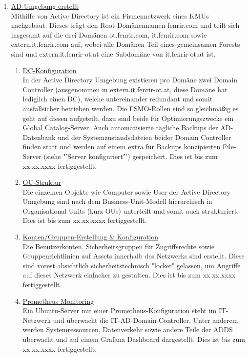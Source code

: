 \documentclass[
	headings=optiontotocandhead,%
	oneside,
	numbers=noenddot,%
	toc=flat, %
	10pt, %
	parskip=full, %
	listof=totoc, %
	listof=flat, %
	numbers=noenddot, %
	bibliography=totoc, %
	a4paper,DIV=14,
]{scrartcl}
\begin{document}
\begin{enumerate}[start=1,label={\bfseries Ziel-H \arabic*},leftmargin=*,wide]
\begin{enumerate}[label=\alph*.]
\item{\underline{AD-Umgebung erstellt}}\\
Mithilfe von Active Directory ist ein Firmennetzwerk eines KMUs nachgebaut. Dieses trägt den Root-Domänennamen fenrir.com und teilt sich insgesamt auf die drei Domänen ot.fenrir.com, it.fenrir.com sowie extern.it.fenrir.com auf, wobei alle Domänen Teil eines gemeinsamen Forests sind und extern.it.fenrir-ot.at eine Subdomäne von it.fenrir-ot.at ist.

\begin{enumerate}[label=\roman*.]
\item{\underline{DC-Konfiguration}}\\
In der Active Directory Umgebung existieren pro Domäne zwei Domain Controller (ausgenommen in extern.it.fenrir-ot.at, diese Domäne hat lediglich einen DC), welche untereinander redundant und somit ausfallsicher betrieben werden. Die FSMO-Rollen sind so gleichmäßig es geht auf diesen aufgeteilt, dazu sind beide für Optimierungszwecke ein Global Catalog-Server. Auch automatisierte tägliche Backups der AD-Datenbank und der Systemzustandsdateien beider Domain Controller finden statt und werden auf einem extra für Backups konzipierten File-Server (siehe "'Server konfiguriert"') gespeichert. Dies ist bis zum xx.xx.xxxx fertiggestellt.

\item{\underline{OU-Struktur}}\\
Die einzelnen Objekte wie Computer sowie User der Active Directory Umgebung sind nach dem Business-Unit-Modell hierarchisch in Organisational Units (kurz OUs) unterteilt und somit auch strukturiert. Dies ist bis zum xx.xx.xxxx fertiggestellt.

\item{\underline{Konten/Gruppen-Erstellung \& Konfiguration}}\\
Die Benutzerkonten, Sicherheitsgruppen für Zugriffsrechte sowie Gruppenrichtlinien auf Assets innerhalb des Netzwerks sind erstellt. Diese sind vorest absichtlich sicherheitstechnisch "locker" gelassen, um Angriffe auf dieses Netzwerk einfacher zu gestalten. Dies ist bis zum xx.xx.xxxx fertiggestellt.

\item{\underline{Prometheus Monitoring}}\\
Ein Ubuntu-Server mit einer Prometheus-Konfiguration steht im IT-Netzwerk und überwacht die IT-AD-Domain-Controller. Unter anderem werden Systemressourcen, Datenverkehr sowie andere Teile der ADDS überwacht und auf einem Grafana Dashboard dargestellt. Dies ist bis zum xx.xx.xxxx fertiggestellt.
\end{enumerate}


\end{enumerate}
\end{enumerate}
\end{document}
